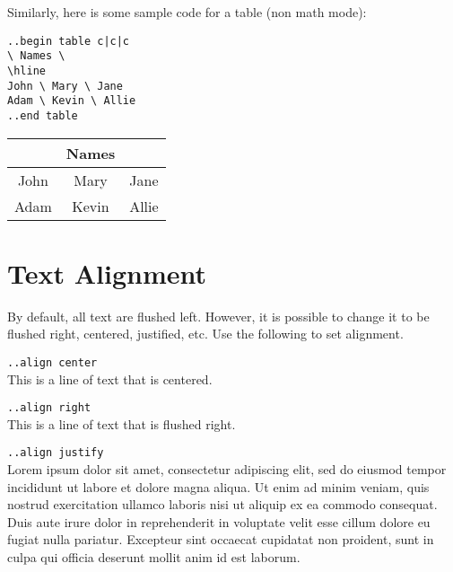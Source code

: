 \documentclass[12pt]{article}
\begin{document}
\begin{flushleft}
\bigskip

Similarly, here is some sample code for a table (non math mode): \\

\medskip

\verb=..begin table c|c|c= \\
\verb|\ Names \| \\
\verb|\hline| \\
\verb|John \ Mary \ Jane| \\
\verb|Adam \ Kevin \ Allie| \\
\verb|..end table|

\bigskip

\begin{tabular}{c|c|c}
& Names & \\
\hline
John & Mary & Jane \\
Adam & Kevin & Allie 
\end{tabular}

\newpage

\section*{Text Alignment}

By default, all text are flushed left. However, it is possible to change it to be flushed right, centered, justified, etc. Use the following to set alignment.

\end{flushleft}

\begin{center}
\verb|..align center|\\
This is a line of text that is centered.

\end{center}

\begin{flushright}
\verb|..align right|\\
This is a line of text that is flushed right.

\end{flushright}
\verb|..align justify|\\
Lorem ipsum dolor sit amet, consectetur adipiscing elit, sed do eiusmod tempor incididunt ut labore et dolore magna aliqua. Ut enim ad minim veniam, quis nostrud exercitation ullamco laboris nisi ut aliquip ex ea commodo consequat. Duis aute irure dolor in reprehenderit in voluptate velit esse cillum dolore eu fugiat nulla pariatur. Excepteur sint occaecat cupidatat non proident, sunt in culpa qui officia deserunt mollit anim id est laborum.
\end{document}
